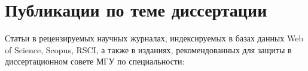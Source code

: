 \documentclass[a4paper, 14pt]{extreport}
\begin{document}
\section*{Публикации по теме диссертации}
Статьи в рецензируемых научных журналах, индексируемых в базах данных Web of Science, Scopus, RSCI, а также в изданиях, рекомендованных для защиты в диссертационном совете МГУ по специальности:
\begin{enumerate}
  
\end{enumerate}
\thispagestyle{empty} %
\end{document}
